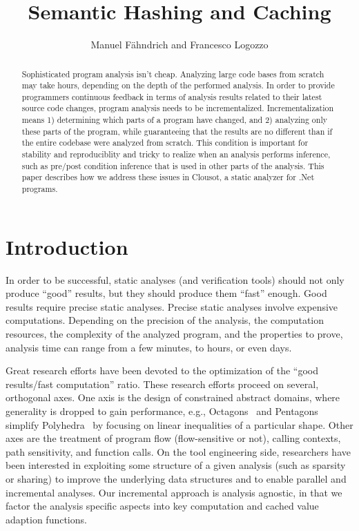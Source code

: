 \documentclass{llncs}
\title{Semantic Hashing and Caching}
\author{Manuel F\"ahndrich and Francesco Logozzo}
\institute{Microsoft Research, Redmond, WA (USA)}
\begin{document}
\maketitle

\begin{abstract}
Sophisticated program analysis isn't cheap. Analyzing large code bases
from scratch may take hours, depending on the depth of the performed
analysis. In order to provide programmers continuous feedback in terms
of analysis results related to their latest source code changes,
program analysis needs to be incrementalized. Incrementalization means
1) determining which parts of a program have changed, and 2) analyzing
only these parts of the program, while guaranteeing that the results
are no different than if the entire codebase were analyzed from
scratch. This condition is important for stability and reproduciblity
and tricky to realize when an analysis performs inference, such as
pre/post condition inference that is used in other parts of the
analysis. This paper describes how we address these issues in Clousot,
a static analyzer for .Net programs.
\end{abstract}

\section{Introduction}
In order to be successful,  static analyses (and verification tools) should not only produce ``good'' results, but they should  produce them ``fast'' enough.
Good results require precise static analyses.
Precise static analyses involve expensive computations. 
Depending on the precision of the analysis, the computation resources, the complexity of the analyzed program, and the properties to prove, analysis time can range from a few minutes, to hours, or even days.

Great research efforts have been devoted to the optimization of the  ``good results/fast computation'' ratio.
These research efforts proceed on several, orthogonal axes.  
One axis is the design of constrained abstract domains, where generality is dropped to gain performance, e.g., Octagons~\cite{Mine-HOSC06} and Pentagons~\cite{LogozzoFahndrich08-2} simplify Polyhedra~\cite{CousotHalbwachs78} by focusing on linear inequalities of a particular shape.
Other axes are the treatment of program flow (flow-sensitive or not), calling contexts, path sensitivity, and function calls.
On the tool engineering side, researchers have been interested in exploiting some structure of a given analysis (such as sparsity or sharing) to improve the underlying data structures and to enable parallel and incremental analyses.
Our incremental approach is analysis agnostic, in that we factor the analysis specific aspects into key computation and cached value adaption functions.
\end{document}
